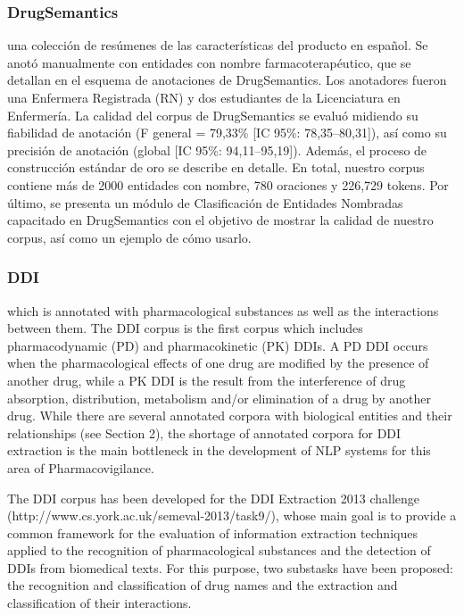\subsubsection*{DrugSemantics}

una colección de resúmenes de las características del producto en español. Se anotó manualmente con entidades con nombre farmacoterapéutico, que se detallan en el esquema de anotaciones de DrugSemantics. Los anotadores fueron una Enfermera Registrada (RN) y dos estudiantes de la Licenciatura en Enfermería. La calidad del corpus de DrugSemantics se evaluó midiendo su fiabilidad de anotación (F general = 79,33\% [IC 95\%: 78,35–80,31]), así como su precisión de anotación (global [IC 95\%: 94,11–95,19]). Además, el proceso de construcción estándar de oro se describe en detalle. En total, nuestro corpus contiene más de 2000 entidades con nombre, 780 oraciones y 226,729 tokens. Por último, se presenta un módulo de Clasificación de Entidades Nombradas capacitado en DrugSemantics con el objetivo de mostrar la calidad de nuestro corpus, así como un ejemplo de cómo usarlo.

\subsubsection*{DDI}

which is annotated with pharmacological substances as well as the interactions between them. The DDI corpus is the first corpus which includes pharmacodynamic (PD) and pharmacokinetic (PK) DDIs. A PD DDI occurs when the pharmacological effects of one drug are modified by the presence of another drug, while a PK DDI is the result from the interference of drug absorption, distribution, metabolism and/or elimination of a drug by another drug. While there are several annotated corpora with biological entities and their relationships (see Section 2), the shortage of annotated corpora for DDI extraction is the main bottleneck in the development of NLP systems for this area of Pharmacovigilance.

The DDI corpus has been developed for the DDI Extraction 2013 challenge (http://www.cs.york.ac.uk/semeval-2013/task9/), whose main goal is to provide a common framework for the evaluation of information extraction techniques applied to the recognition of pharmacological substances and the detection of DDIs from biomedical texts. For this purpose, two substasks have been proposed: the recognition and classification of drug names and the extraction and classification of their interactions.

